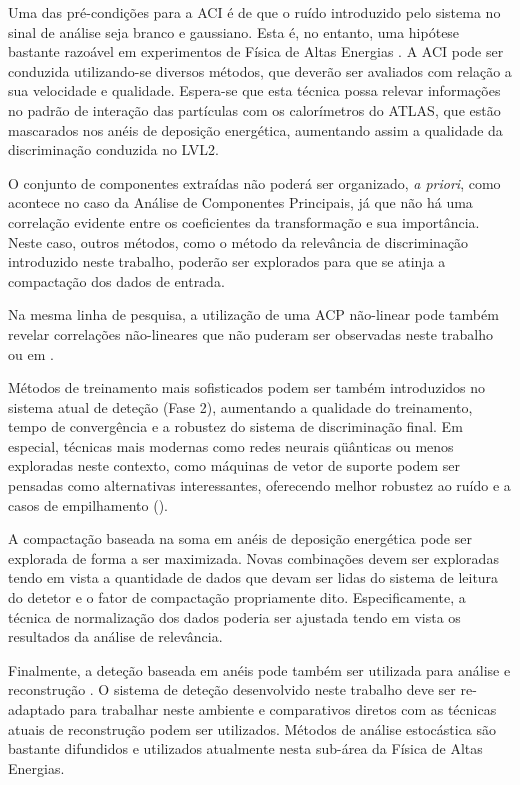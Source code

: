 Uma das pré-condições para a ACI é de que o ruído introduzido pelo sistema no
sinal de análise seja branco e gaussiano. Esta é, no entanto, uma hipótese
bastante razoável em experimentos de Física de Altas Energias \cite{knoll,
leo}. A ACI pode ser conduzida utilizando-se diversos métodos, que deverão ser
avaliados com relação a sua velocidade e qualidade. Espera-se que esta técnica
possa relevar informações no padrão de interação das partículas com os
calorímetros do ATLAS, que estão mascarados nos anéis de deposição energética,
aumentando assim a qualidade da discriminação conduzida no LVL2.

O conjunto de componentes extraídas não poderá ser organizado, \textit{a
priori}, como acontece no caso da Análise de Componentes Principais, já que
não há uma correlação evidente entre os coeficientes da transformação e sua
importância. Neste caso, outros métodos, como o método da relevância de
discriminação introduzido neste trabalho, poderão ser explorados para que se
atinja a compactação dos dados de entrada.

Na mesma linha de pesquisa, a utilização de uma ACP não-linear pode também
revelar correlações não-lineares que não puderam ser observadas neste trabalho
ou em \cite{herman}.

Métodos de treinamento mais sofisticados podem ser também introduzidos no
sistema atual de deteção (Fase 2), aumentando a qualidade do treinamento,
tempo de convergência e a robustez do sistema de discriminação final. Em
especial, técnicas mais modernas como redes neurais qüânticas \cite{qnns} ou
menos exploradas neste contexto, como máquinas de vetor de suporte
\cite{haykin} podem ser pensadas como alternativas interessantes, oferecendo
melhor robustez ao ruído e a casos de empilhamento ().

A compactação baseada na soma em anéis de deposição energética pode ser
explorada de forma a ser maximizada. Novas combinações devem ser exploradas
tendo em vista a quantidade de dados que devam ser lidas do sistema de
leitura do detetor e o fator de compactação propriamente dito. Especificamente,
a técnica de normalização dos dados poderia ser ajustada tendo em vista os
resultados da análise de relevância.

Finalmente, a deteção baseada em anéis pode também ser utilizada para análise
e reconstrução . O sistema de deteção desenvolvido neste trabalho
deve ser re-adaptado para trabalhar neste ambiente e comparativos diretos com
as técnicas atuais de reconstrução podem ser utilizados. Métodos de análise
estocástica são bastante difundidos e utilizados atualmente nesta sub-área da
Física de Altas Energias.

